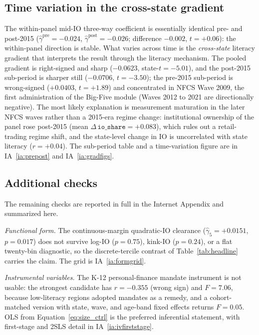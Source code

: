 \subsection{Time variation in the cross-state gradient}
\label{sec:robust_prepost}

The within-panel mid-IO three-way coefficient is essentially identical pre- and post-2015 ($\hat\gamma^{\text{pre}} = -0.024$, $\hat\gamma^{\text{post}} = -0.026$; difference $-0.002$, $t = +0.06$): the within-panel direction is stable. What varies across time is the \emph{cross-state} literacy gradient that interprets the result through the literacy mechanism. The pooled gradient is right-signed and sharp ($-0.0623$, state-$t = -5.01$), and the post-2015 sub-period is sharper still ($-0.0706$, $t = -3.50$); the pre-2015 sub-period is wrong-signed ($+0.0403$, $t = +1.89$) and concentrated in NFCS Wave 2009, the first administration of the Big-Five module (Waves 2012 to 2021 are directionally negative). The most likely explanation is measurement maturation in the later NFCS waves rather than a 2015-era regime change: institutional ownership of the panel rose post-2015 (mean $\Delta\,\mathtt{io\_share} = +0.083$), which rules out a retail-trading regime shift, and the state-level change in IO is uncorrelated with state literacy ($r = +0.04$). The sub-period table and a time-variation figure are in IA~\ref{ia:prepost} and IA~\ref{ia:gradfigs}.

\subsection{Additional checks}
\label{sec:robust_battery}

The remaining checks are reported in full in the Internet Appendix and summarized here.

\textit{Functional form.} The continuous-margin quadratic-IO clearance ($\hat\gamma_{5} = +0.0151$, $p = 0.017$) does not survive log-IO ($p = 0.75$), kink-IO ($p = 0.24$), or a flat twenty-bin diagnostic, so the discrete-tercile contrast of Table~\ref{tab:headline} carries the claim. The grid is IA~\ref{ia:formgrid}.

\textit{Instrumental variables.} The K-12 personal-finance mandate instrument is not usable: the strongest candidate has $r = -0.355$ (wrong sign) and $F = 7.06$, because low-literacy regions adopted mandates as a remedy, and a cohort-matched version with state, wave, and age-band fixed effects returns $F = 0.05$. OLS from Equation~\eqref{eq:size_ctrl} is the preferred inferential statement, with first-stage and 2SLS detail in IA~\ref{ia:ivfirststage}.

